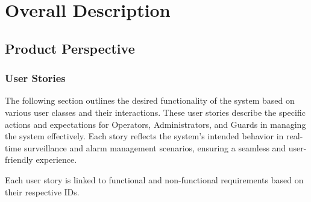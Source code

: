 \documentclass{article}
\begin{document}
\newpage

\section{Overall Description}

\subsection{Product Perspective}

\subsubsection{User Stories}

The following section outlines the desired functionality of the system based on various user classes and their interactions. These user stories describe the specific actions and expectations for Operators, Administrators, and Guards in managing the system effectively. Each story reflects the system's intended behavior in real-time surveillance and alarm management scenarios, ensuring a seamless and user-friendly experience.

Each user story is linked to functional and non-functional requirements based on their respective IDs.
\end{document}
